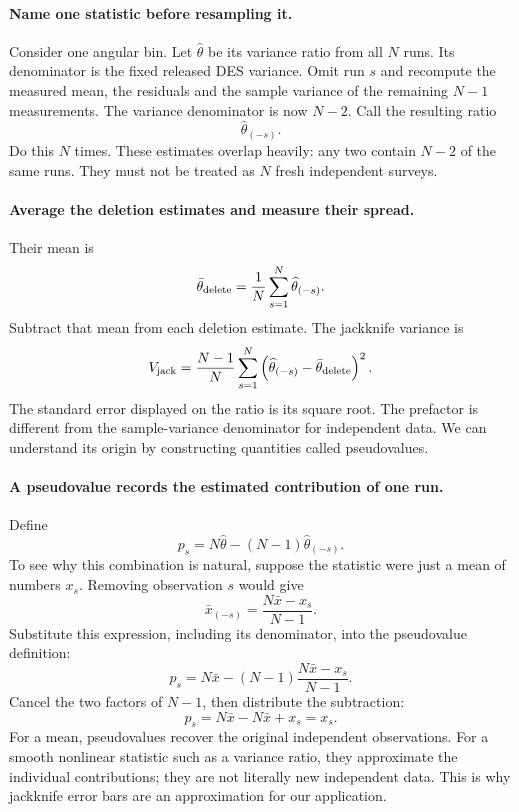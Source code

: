 \documentclass[11pt]{article}
\begin{document}
\paragraph{Name one statistic before resampling it.}
Consider one angular bin. Let $\widehat\theta$ be its variance ratio from
all $N$ runs. Its denominator is the fixed released DES variance. Omit run
$s$ and recompute the measured mean, the residuals and the sample variance
of the remaining $N-1$ measurements. The variance denominator is now $N-2$.
Call the resulting ratio
\begin{equation}
 \widehat\theta_{(-s)}.
\end{equation}
Do this $N$ times. These estimates overlap heavily: any two contain $N-2$
of the same runs. They must not be treated as $N$ fresh independent surveys.

\paragraph{Average the deletion estimates and measure their spread.}
Their mean is
\begin{equation}
 \bar\theta_{\rm delete}=\frac1N\sum_{s=1}^{N}\widehat\theta_{(-s)}.
\end{equation}
Subtract that mean from each deletion estimate. The jackknife variance is
\begin{equation}
 V_{\rm jack}=\frac{N-1}{N}\sum_{s=1}^{N}
 \left(\widehat\theta_{(-s)}-\bar\theta_{\rm delete}\right)^2.
 \label{eq:jackknife-variance}
\end{equation}
The standard error displayed on the ratio is its square root. The prefactor
is different from the sample-variance denominator for independent data.
We can understand its origin by constructing quantities called pseudovalues.

\paragraph{A pseudovalue records the estimated contribution of one run.}
Define
\begin{equation}
 p_s=N\widehat\theta-(N-1)\widehat\theta_{(-s)}.
\end{equation}
To see why this combination is natural, suppose the statistic were just a
mean of numbers $x_s$. Removing observation $s$ would give
\begin{equation}
 \bar x_{(-s)}=\frac{N\bar x-x_s}{N-1}.
\end{equation}
Substitute this expression, including its denominator, into the
pseudovalue definition:
\begin{equation}
 p_s=N\bar x-(N-1)\frac{N\bar x-x_s}{N-1}.
\end{equation}
Cancel the two factors of $N-1$, then distribute the subtraction:
\begin{equation}
 p_s=N\bar x-N\bar x+x_s=x_s.
\end{equation}
For a mean, pseudovalues recover the original independent observations.
For a smooth nonlinear statistic such as a variance ratio, they approximate
the individual contributions; they are not literally new independent data.
This is why jackknife error bars are an approximation for our application.
\end{document}
